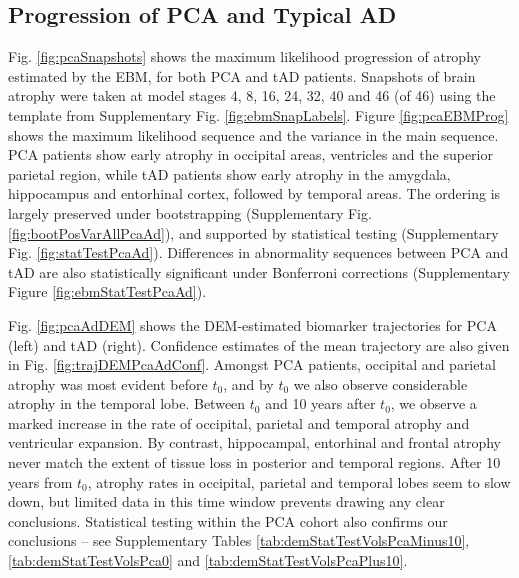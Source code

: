 \newcommand*{\scaleBrainImg}{0.25}


\newcommand*{\snapLocationPCA}{\pcaPaperFigs/ebmSnapshotsPCA} %
\newcommand*{\snapLocationAD}{\pcaPaperFigs/ebmSnapshotsAD} 
\newcommand*{\snapLocationEAR}{\pcaPaperFigs/ebmSnapshotsEAR} 
\newcommand*{\snapLocationPER}{\pcaPaperFigs/ebmSnapshotsPER} 
\newcommand*{\snapLocationSPA}{\pcaPaperFigs/ebmSnapshotsSPA} 

\newcommand*{\snapScale}{0.6} 

\subsection{Progression of PCA and Typical AD}
\label{sec:pcaResPcaAd}

Fig. \ref{fig:pcaSnapshots} shows the maximum likelihood progression of atrophy estimated by the EBM, for both PCA and tAD patients. Snapshots of brain atrophy were taken at model stages 4, 8, 16, 24, 32, 40 and 46 (of 46) using the template from Supplementary Fig. \ref{fig:ebmSnapLabels}. Figure \ref{fig:pcaEBMProg} shows the maximum likelihood sequence and the variance in the main sequence. PCA patients show early atrophy in  occipital areas, ventricles and the superior parietal region, while tAD patients show early atrophy in the amygdala, hippocampus and entorhinal cortex, followed by temporal areas. The ordering is largely preserved under bootstrapping (Supplementary Fig. \ref{fig:bootPosVarAllPcaAd}), and supported by statistical testing (Supplementary Fig. \ref{fig:statTestPcaAd}). Differences in abnormality sequences between PCA and tAD are also statistically significant under Bonferroni corrections (Supplementary Figure \ref{fig:ebmStatTestPcaAd}).
 
Fig. \ref{fig:pcaAdDEM} shows the DEM-estimated biomarker trajectories for PCA (left) and tAD (right). Confidence estimates of the mean trajectory are also given in Fig. \ref{fig:trajDEMPcaAdConf}. Amongst PCA patients, occipital and parietal atrophy was most evident before $t_0$, and by $t_0$ we also observe considerable atrophy in the temporal lobe. Between $t_0$ and 10 years after $t_0$, we observe a marked increase in the rate of occipital, parietal and temporal atrophy and ventricular expansion. By contrast, hippocampal, entorhinal and frontal atrophy never match the extent of tissue loss in posterior and temporal regions. After 10 years from $t_0$, atrophy rates in occipital, parietal and temporal lobes seem to slow down, but limited data in this time window prevents drawing any clear conclusions. Statistical testing within the PCA cohort also confirms our conclusions -- see Supplementary Tables \ref{tab:demStatTestVolsPcaMinus10}, \ref{tab:demStatTestVolsPca0} and \ref{tab:demStatTestVolsPcaPlus10}.

